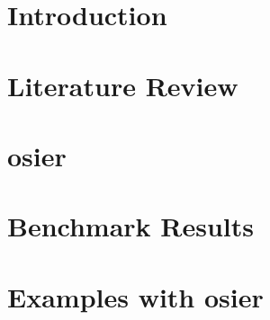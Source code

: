 \chapter{Introduction}



\chapter{Literature Review}
\label{chapter:lit-review}
% 

\chapter{\acf{osier}}
\label{chapter:osier}
% 


\chapter{Benchmark Results}
\label{chapter:benchmark-results}


\chapter{Examples with \acs{osier}}
\label{chapter:examples}





